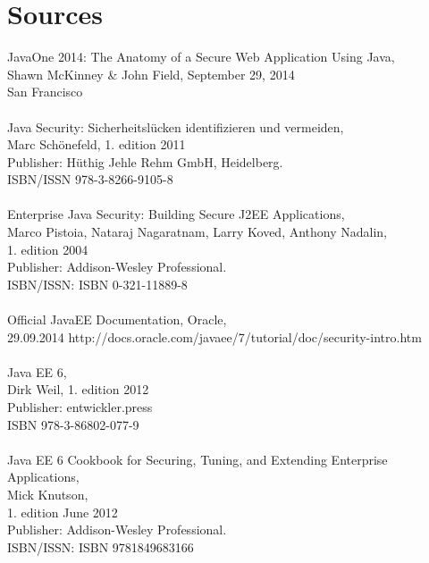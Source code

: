 \documentclass[12pt,a4paper,draft]{report}
\begin{document}
\section*{Sources}
JavaOne 2014: The Anatomy of a Secure Web Application Using Java, \\
Shawn McKinney \& John Field, September 29, 2014\\
San Francisco\\\\
Java Security: Sicherheitslücken identifizieren und vermeiden, \\
Marc Schönefeld, 1. edition 2011\\
Publisher: Hüthig Jehle Rehm GmbH, Heidelberg. \\
ISBN/ISSN 978-3-8266-9105-8\\\\
Enterprise Java Security: Building Secure J2EE Applications,\\
Marco Pistoia, Nataraj Nagaratnam, Larry Koved, Anthony Nadalin,\\
1. edition 2004 \\
Publisher: Addison-Wesley Professional.\\
ISBN/ISSN: ISBN 0-321-11889-8\\\\
Official JavaEE Documentation, Oracle,\\
29.09.2014
http://docs.oracle.com/javaee/7/tutorial/doc/security-intro.htm\\\\
Java EE 6,\\
Dirk Weil, 1. edition 2012\\
Publisher: entwickler.press\\
ISBN 978-3-86802-077-9\\\\
Java EE 6 Cookbook for Securing, Tuning, and Extending Enterprise Applications,\\
Mick Knutson,\\
1. edition June 2012 \\
Publisher: Addison-Wesley Professional.\\
ISBN/ISSN: ISBN 9781849683166\\\\
\end{document}
